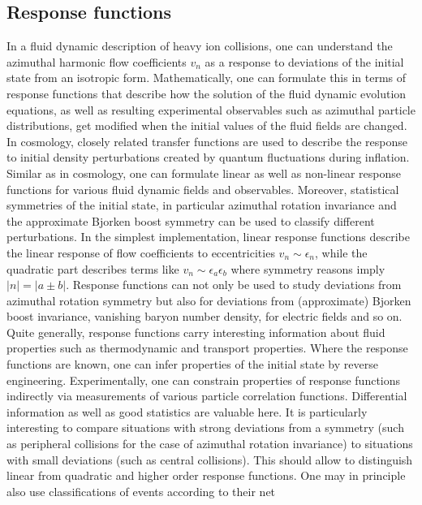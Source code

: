 \subsection{Response functions}
In a fluid dynamic description of heavy ion collisions,  one can understand 
  the azimuthal harmonic flow coefficients $v_n$ as a response to deviations 
  of the initial state from an isotropic form. 
Mathematically,  one can formulate this in terms of response functions that 
  describe how the solution of the fluid dynamic evolution equations,  
  as well as resulting experimental observables such as azimuthal particle 
  distributions, get modified when the initial values of the fluid fields 
  are changed. 
In cosmology, closely related transfer functions are used to describe the 
  response to initial density perturbations created by quantum fluctuations 
  during inflation. Similar as in cosmology,  one can formulate linear as 
  well as non-linear response functions for various fluid dynamic fields 
  and observables. 
Moreover,  statistical symmetries of the initial state,  in particular 
  azimuthal rotation invariance and the approximate Bjorken boost symmetry 
  can be used to classify different perturbations. 
In the simplest implementation,  linear response functions describe the 
  linear response of flow coefficients to eccentricities $v_n \sim\epsilon_n$,  
  while the quadratic part describes terms like $v_n \sim \epsilon_a\epsilon_b$ 
  where symmetry reasons imply $|n|=|a\pm b|$. Response functions can not only be 
  used to study deviations from azimuthal rotation symmetry but also for deviations 
  from (approximate) Bjorken boost invariance,  vanishing baryon number density,  
  for electric fields and so on. 
Quite generally, response functions carry interesting information about fluid 
  properties such as thermodynamic and transport properties. 
  Where the response functions are known,  one can infer properties of the 
  initial state by reverse engineering.
Experimentally,  one can constrain properties of response functions indirectly 
  via measurements of various particle correlation functions. 
Differential information as well as good statistics are valuable here. 
  It is particularly interesting to compare situations with strong deviations 
  from a symmetry (such as peripheral collisions for the case of azimuthal 
  rotation invariance) to situations with small deviations (such as central collisions). 
This should allow to distinguish linear from quadratic and higher order response functions.
One may in principle also use classifications of events according to their net 
